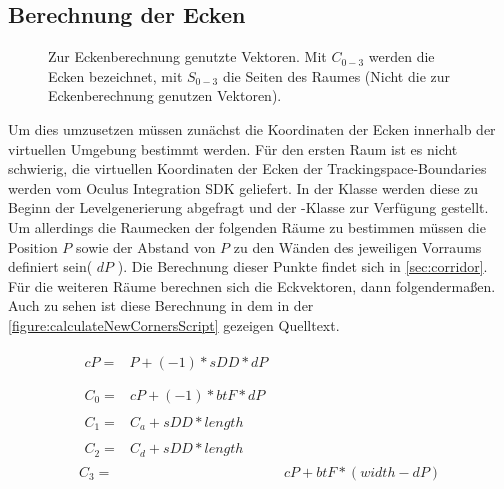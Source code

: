 \subsection{Berechnung der Ecken}
\label{subsection:calccorners}

\begin{figure}[H]
    \centering
    
    \caption{Zur Eckenberechnung genutzte Vektoren. Mit $C_{0-3}$ werden die Ecken bezeichnet, mit $S_{0-3}$ die Seiten des Raumes (Nicht die zur Eckenberechnung genutzen Vektoren). }
    \label{figure:calculateCornersFig}
\end{figure}

Um dies umzusetzen müssen zunächst die Koordinaten der Ecken innerhalb der virtuellen Umgebung bestimmt werden. Für den ersten Raum ist es nicht schwierig, die virtuellen Koordinaten der Ecken der Trackingspace-Boundaries werden vom Oculus Integration SDK geliefert.
In der  Klasse werden diese zu Beginn der Levelgenerierung abgefragt und der -Klasse zur Verfügung gestellt. Um allerdings die Raumecken der folgenden Räume zu bestimmen müssen die Position $P$ sowie der Abstand von $P$ zu den Wänden des jeweiligen Vorraums definiert sein( $dP$ ). Die Berechnung dieser Punkte findet sich in \autoref{sec:corridor}. Für die weiteren Räume berechnen sich die Eckvektoren, dann folgendermaßen. Auch zu sehen ist diese Berechnung in dem in der \autoref{figure:calculateNewCornersScript} gezeigen Quelltext.



    \begin{align}
        \begin{split}\label{eq:1}
            cP ={}& P + (-1) * sDD * dP
        \end{split}\\ \\
        \begin{split}\label{eq:2}
            C_0 ={}& cP + (-1) * btF * dP
        \end{split}\\
        \begin{split}\label{eq:3}
            C_1 ={}& C_a + sDD * length
        \end{split}\\
        \begin{split}\label{eq:4}
            C_2 ={}& C_d + sDD * length
        \end{split}\\
            C_3 ={}& cP + btF * (width - dP)\label{eq:5}
        \end{align}

